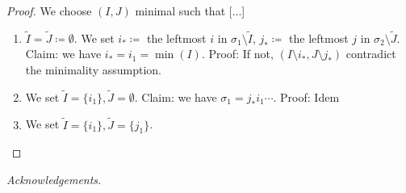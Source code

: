\documentclass[11pt]{amsart}
\theoremstyle{definition}
\theoremstyle{remark}
\numberwithin{equation}{section}
\newcommand{\0}{\color{blue}{\mathsf{0}}}
\begin{document}
\begin{proof}
    We choose $(I,J)$ minimal such that [...] 
\begin{enumerate}
    \item $\tilde I =\tilde J \coloneqq \emptyset$. 
    We set $i_{*}\coloneqq$ the leftmost $i$ in $\sigma_1 \setminus \tilde I$, $j_{*}\coloneqq$ the leftmost $j$ in $\sigma_2 \setminus \tilde J$.
    Claim: we have $i_{*}=i_1=\min(I)$.
    Proof: If not, $(I\setminus i_{*}, J \setminus j_{*})$ contradict the minimality assumption. 
    \item We set $\tilde I = \{i_1\}, \tilde J = \emptyset$. 
    Claim: we have $\sigma_1 = j_{*}i_1 \cdots$.
    Proof: Idem
    \item We set $\tilde I = \{i_1\}, \tilde J = \{j_1\}$. 
\end{enumerate}
\end{proof}

\emph{Acknowledgements.}    





\end{document}
